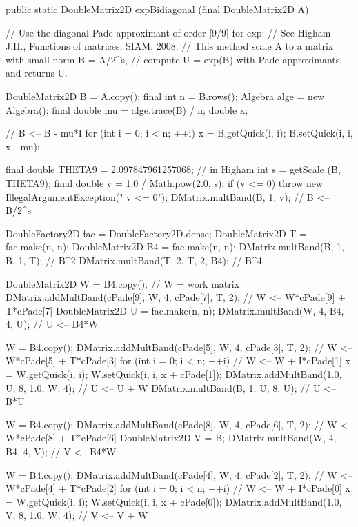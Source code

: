 \begin{code}

   public static DoubleMatrix2D expBidiagonal (final DoubleMatrix2D A) \begin{hide} {
      // Use the diagonal Pade approximant of order [9/9] for exp:
      // See Higham J.H., Functions of matrices, SIAM, 2008.
      // This method scale A to a matrix with small norm B = A/2^s,
      // compute U = exp(B) with Pade approximants, and returns U.

      DoubleMatrix2D B = A.copy();
      final int n = B.rows();
      Algebra alge = new Algebra();
      final double mu = alge.trace(B) / n;
      double x;

      // B <-- B - mu*I
      for (int i = 0; i < n; ++i) {
         x = B.getQuick(i, i);
         B.setQuick(i, i, x - mu);
      }

      final double THETA9 = 2.097847961257068; // in Higham
      int s = getScale (B, THETA9);
      final double v = 1.0 / Math.pow(2.0, s);
      if (v <= 0)
         throw new IllegalArgumentException("   v <= 0");
      DMatrix.multBand(B, 1, v); // B <-- B/2^s

      DoubleFactory2D fac = DoubleFactory2D.dense;
      DoubleMatrix2D T = fac.make(n, n);
      DoubleMatrix2D B4 = fac.make(n, n);
      DMatrix.multBand(B, 1, B, 1, T); // B^2
      DMatrix.multBand(T, 2, T, 2, B4); // B^4

      DoubleMatrix2D W = B4.copy(); // W = work matrix
      DMatrix.addMultBand(cPade[9], W, 4, cPade[7], T, 2); // W <-- W*cPade[9] + T*cPade[7]
      DoubleMatrix2D U = fac.make(n, n);
      DMatrix.multBand(W, 4, B4, 4, U); // U <-- B4*W

      W = B4.copy();
      DMatrix.addMultBand(cPade[5], W, 4, cPade[3], T, 2); // W <-- W*cPade[5] + T*cPade[3]
      for (int i = 0; i < n; ++i) {   // W <-- W + I*cPade[1]
         x = W.getQuick(i, i);
         W.setQuick(i, i, x + cPade[1]);
      }
      DMatrix.addMultBand(1.0, U, 8, 1.0, W, 4); // U <-- U + W
      DMatrix.multBand(B, 1, U, 8, U); // U <-- B*U

      W = B4.copy();
      DMatrix.addMultBand(cPade[8], W, 4, cPade[6], T, 2); // W <-- W*cPade[8] + T*cPade[6]
      DoubleMatrix2D V = B;
      DMatrix.multBand(W, 4, B4, 4, V); // V <-- B4*W

      W = B4.copy();
      DMatrix.addMultBand(cPade[4], W, 4, cPade[2], T, 2); // W <-- W*cPade[4] + T*cPade[2]
      for (int i = 0; i < n; ++i) {   // W <-- W + I*cPade[0]
         x = W.getQuick(i, i);
         W.setQuick(i, i, x + cPade[0]);
      }
      DMatrix.addMultBand(1.0, V, 8, 1.0, W, 4); // V <-- V + W

}
\end{hide}
\end{code}
